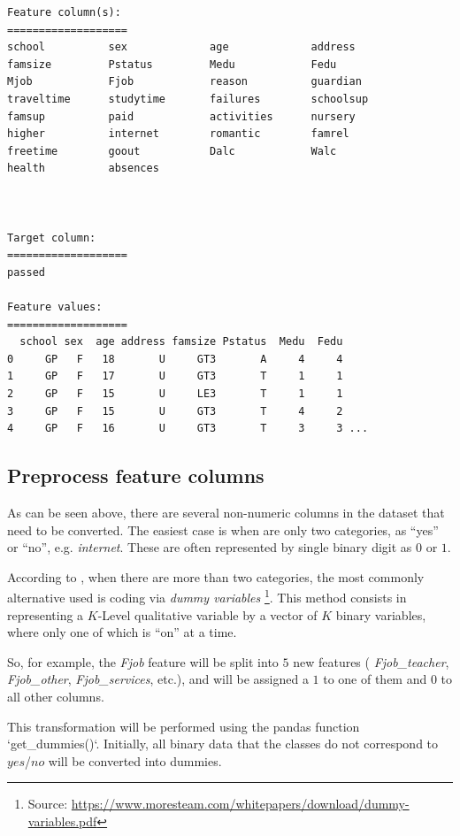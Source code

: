 \documentclass[a4paper]{article}
\begin{document}
\begin{lstlisting}
Feature column(s):
===================
school         	sex            	age            	address        
famsize        	Pstatus        	Medu           	Fedu           
Mjob           	Fjob           	reason         	guardian       
traveltime     	studytime      	failures       	schoolsup      
famsup         	paid           	activities     	nursery        
higher         	internet       	romantic       	famrel         
freetime       	goout          	Dalc           	Walc           
health         	absences       



Target column:
===================
passed

Feature values:
===================
  school sex  age address famsize Pstatus  Medu  Fedu
0     GP   F   18       U     GT3       A     4     4
1     GP   F   17       U     GT3       T     1     1
2     GP   F   15       U     LE3       T     1     1
3     GP   F   15       U     GT3       T     4     2
4     GP   F   16       U     GT3       T     3     3 ...
\end{lstlisting}

\subsection{Preprocess feature columns}
As can be seen above, there are several non-numeric columns in the dataset that need to be converted. The easiest case is when are only two categories, as ``yes'' or ``no'', e.g. \textit{internet}. These are often represented by single binary digit as $0$ or $1$.

According to \cite{Hastie_2009}, when there are more than two categories, the most commonly alternative used is coding via \textit{dummy variables} \footnote{Source: \url{https://www.moresteam.com/whitepapers/download/dummy-variables.pdf}}. This method consists in representing a $K$-Level qualitative variable by a vector of $K$ binary variables, where only one of which is ``on'' at a time.

So, for example, the \textit{Fjob} feature will be split into $5$ new features ( \textit{Fjob\_teacher}, \textit{Fjob\_other}, \textit{Fjob\_services}, etc.), and will be assigned a $1$ to one of them and $0$ to all other columns.

This transformation will be performed using the pandas function `get\_dummies()`. Initially, all binary data that the classes do not correspond to $yes$/$no$ will be converted into dummies.
\end{document}

